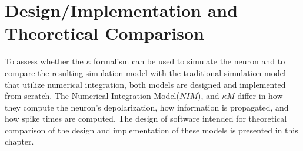 \documentclass[b5paper,12 pt]{report}
\begin{document}
	\chapter{Design/Implementation and Theoretical Comparison} %
	\label{chDesignAndTheroeticalComparison}

		To assess whether the $\kappa$ formalism can be used to simulate the neuron and to compare the resulting simulation 
			model with the traditional simulation model that utilize numerical integration, %
			both models are designed and implemented from scratch.
		The Numerical Integration Model($NIM$), and $\kappa M$ differ in how they compute the neuron's depolarization, 
			how information is propagated, and how spike times are computed. %
		The design of software intended for theoretical comparison of the design and implementation of these models is presented in this chapter.
\end{document}
